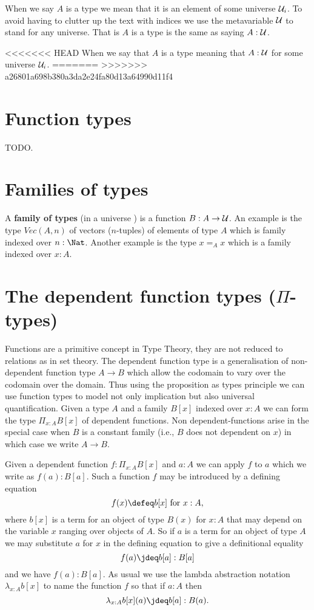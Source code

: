 {When we say $A$ is a type we mean that it is an element of some
universe ${\mathcal U}_i$. To avoid having to clutter up the text with indices
we use the metavariable ${\mathcal U}$ to stand for any universe. That is $A$
is a type is the same as saying $A : {\mathcal U}$.

<<<<<<< HEAD
When we say that $A$ is a type meaning that $A : {\mathcal U}$ for some universe
${\mathcal U}_i$. 
=======
>>>>>>> a26801a698b380a3da2e24fa80d13a64990d11f4

\section{Function types}
\label{sec:function-types}

TODO.


\section{Families of types}
\label{sec:families-of-types}

A \textbf{family of types} (in a universe \UU) is a function $B:A\to{\mathcal U}$.
An example is the type $Vec(A,n)$ of
vectors ($n$-tuples) of elements of type $A$ which is family indexed
over $n : \Nat$. Another example is the type $x =_A x$ which is a
family indexed over $x : A$.


\section{The dependent function types ($\Pi$-types)}
\label{sec:pi-types}

Functions are a primitive concept in Type Theory, they are not reduced
to relations as in set theory. The dependent function type is a
generalisation of non-dependent function type $A \to B$ which allow
the codomain to vary over the codomain over the domain. Thus using the
proposition as types principle we can use function types to model not
only implication but also universal quantification. Given a type $A$
and a family $B[x]$ indexed over $x:A$ we can form the type
$\Pi_{x:A}B[x]$ of dependent functions. Non dependent-functions arise
in the special case when $B$ is a constant family (i.e., $B$ does not
dependent on $x$) in which case we write $A \to B$.

Given a dependent function $f : \Pi_{x:A}B[x]$ and $a : A$ we can
apply $f$ to $a$ which we write as $f(a) : B[a]$.  Such a function $f$ may be introduced by a defining equation
  \[ f(x)\defeq b[x]\mbox{ for } x:A,\]
where $b[x]$ is a term for an object of type $B(x)$ for $x:A$ that may depend on the variable $x$ ranging over objects of $A$.  So if $a$ is a term for an object of type $A$ we may substitute $a$ for $x$ in the defining equation to give a definitional equality
  \[ f(a)\jdeq b[a]:B[a]\]
and we have $f(a):B[a]$.  As usual we use the lambda abstraction notation 
$\lambda_{x:A}b[x]$ to name the function $f$ so that if $a:A$ then
  \[\lambda_{x:A}b[x](a)\jdeq b[a]: B(a).\]

}
